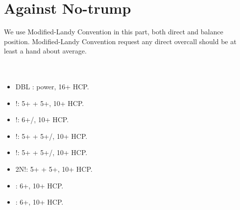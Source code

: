 \documentclass[12pt,twoside,a5paper]{report}%
\begin{document}
\chapter*{Against No-trump}
		We use Modified-Landy Convention in this part, both direct and balance position. Modified-Landy Convention request any direct overcall should be at least a hand about average.\\
		\\
		\\
		\begin{itemize}
		\renewcommand{\labelitemi}{--}
			\item DBL : power, 16+ HCP.
			\item {}!: 5+\sp{} + 5+\he{}, 10+ HCP.
			\item {}!: 6+\sp{}/\he{}, 10+ HCP.
			\item {}!: 5+\he{} + 5+\cl{}/\di{}, 10+ HCP.
			\item {}!: 5+\sp{} + 5+\cl{}/\di{}, 10+ HCP.
			\item 2N!: 5+\cl{} + 5+\di{}, 10+ HCP.
			\item {} : 6+\cl{}, 10+ HCP.
			\item {} : 6+\di{}, 10+ HCP.
		\end{itemize}
\end{document}
